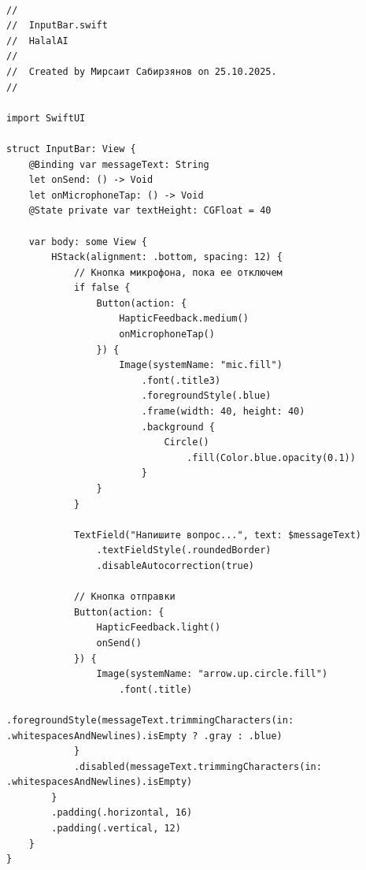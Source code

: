 \begin{lstlisting}[basicstyle=\tiny\ttfamily,breaklines=true]

//
//  InputBar.swift
//  HalalAI
//
//  Created by Мирсаит Сабирзянов on 25.10.2025.
//

import SwiftUI

struct InputBar: View {
    @Binding var messageText: String
    let onSend: () -> Void
    let onMicrophoneTap: () -> Void
    @State private var textHeight: CGFloat = 40
    
    var body: some View {
        HStack(alignment: .bottom, spacing: 12) {
            // Кнопка микрофона, пока ее отключем
            if false {
                Button(action: {
                    HapticFeedback.medium()
                    onMicrophoneTap()
                }) {
                    Image(systemName: "mic.fill")
                        .font(.title3)
                        .foregroundStyle(.blue)
                        .frame(width: 40, height: 40)
                        .background {
                            Circle()
                                .fill(Color.blue.opacity(0.1))
                        }
                }
            }
            
            TextField("Напишите вопрос...", text: $messageText)
                .textFieldStyle(.roundedBorder)
                .disableAutocorrection(true)
            
            // Кнопка отправки
            Button(action: {
                HapticFeedback.light()
                onSend()
            }) {
                Image(systemName: "arrow.up.circle.fill")
                    .font(.title)
                    .foregroundStyle(messageText.trimmingCharacters(in: .whitespacesAndNewlines).isEmpty ? .gray : .blue)
            }
            .disabled(messageText.trimmingCharacters(in: .whitespacesAndNewlines).isEmpty)
        }
        .padding(.horizontal, 16)
        .padding(.vertical, 12)
    }
}
\end{lstlisting}

